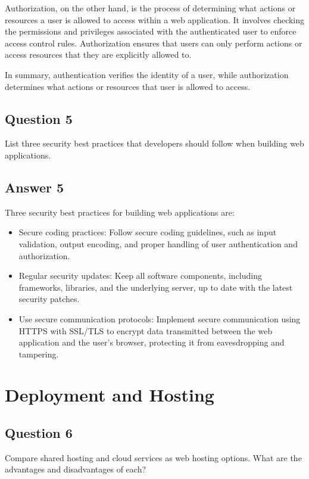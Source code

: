 \documentclass{article}
\begin{document}
Authorization, on the other hand, is the process of determining what actions or resources a user is allowed to access within a web application. It involves checking the permissions and privileges associated with the authenticated user to enforce access control rules. Authorization ensures that users can only perform actions or access resources that they are explicitly allowed to.

In summary, authentication verifies the identity of a user, while authorization determines what actions or resources that user is allowed to access.

\subsection*{Question 5}
List three security best practices that developers should follow when building web applications.

\subsection*{Answer 5}
Three security best practices for building web applications are:
\begin{itemize}
  \item Secure coding practices: Follow secure coding guidelines, such as input validation, output encoding, and proper handling of user authentication and authorization.
  \item Regular security updates: Keep all software components, including frameworks, libraries, and the underlying server, up to date with the latest security patches.
  \item Use secure communication protocols: Implement secure communication using HTTPS with SSL/TLS to encrypt data transmitted between the web application and the user's browser, protecting it from eavesdropping and tampering.
\end{itemize}

\section*{Deployment and Hosting}

\subsection*{Question 6}

Compare shared hosting and cloud services as web hosting options. What are the advantages and disadvantages of each?
\end{document}
